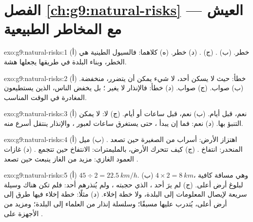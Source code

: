 \section*{الفصل \ref{ch:g9:natural-risks} --- العيش مع المخاطر الطبيعية}

\begin{solution}{exo:g9:natural-risks:1}
(أ) خطر. (ب) . (ج) . (د) خطر. (ه) كلاهما: فالسيول الطينية هي الخطر،
وبناء البلدة في طريقها يجعلها
هشة.
\end{solution}

\begin{solution}{exo:g9:natural-risks:2}
(أ) خطأ: حيث لا يسكن أحد، لا شيء يمكن أن يتضرر،  منخفضة. (ب) صواب.
(ج) صواب. (د) خطأ: فالإنذار لا يغير ؛ بل يخفض  الناس، الذين
يستطيعون المغادرة في الوقت المناسب.
\end{solution}

\begin{solution}{exo:g9:natural-risks:3}
(أ) نعم، قبل أيام. (ب) نعم، قبل ساعات أو أيام. (ج) لا:  لا يمكن التنبؤ
بها. (د) نعم: فما إن يبدأ ، حتى يستغرق ساعات لعبور ، والإنذار
ينتقل أسرع منه.
\end{solution}

\begin{solution}{exo:g9:natural-risks:4}
(أ) اهتزاز الأرض: أسراب من  الصغيرة حين تصعد . (ب) ميل المنحدر:
انتفاخ . (ج) كيف تتحرك الأرض، بالمليمترات: الانتفاخ حين تتجمع .
(د) غازات العمود الغازي: مزيد من الغاز ينبعث حين تصعد
.
\end{solution}

\begin{solution}{exo:g9:natural-risks:5}
(أ) $45 \div 2 = \qty{22.5}{km/h}$. (ب) $4 \times 2 = \qty{8}{km}$، وهي مسافة
كافية لبلوغ أرض أعلى. (ج) لم يرَ أحد ، الذي حجبته ، ولم يُنذرهم أحد:
فلم تكن هناك وسيلة سريعة لإيصال المعلومات إلى البلدة، ولا خطة إخلاء. (د) مثلًا:
خطة إخلاء فيها طرق إلى أرض أعلى، يُتدرب عليها مسبقًا؛ وسلسلة إنذار من العلماء
إلى البلدة؛ ومزيد من الأجهزة على .
\end{solution}

